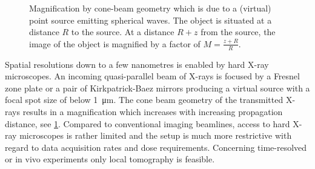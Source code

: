 \documentclass[
twoside,
openright,
titlepage,
numbers=noenddot,
headinclude,
fleqn,
a4paper,
footinclude=true,
cleardoublepage=empty,
abstractoff,
BCOR=5mm,
paper=a4,
fontsize=11pt,
british,ngerman,american,
]{scrreprt}
\begin{document}
\begin{figure}
  \centering
  \caption[Magnification by cone-beam geometry.]{Magnification by
    cone-beam geometry which is due to a (virtual) point source
    emitting spherical waves.  The object is situated at a distance
    $R$ to the source.  At a distance $R+z$ from the source, the image
    of the object is magnified by a factor of $M=\frac{z+R}{R}$.}
  \label{fig:cone-beam-magnification}
\end{figure}
Spatial resolutions down to a few nanometres is enabled by hard X-ray
microscopes.  An incoming quasi-parallel beam of X-rays is focused by
a Fresnel zone plate or a pair of Kirkpatrick-Baez mirrors
\cite{Hignette2005} producing a virtual source with a focal spot size
of below \SI{1}{\micro\metre}.  The cone beam geometry of the
transmitted X-rays results in a magnification which increases with
increasing propagation distance, see
\cref{fig:cone-beam-magnification}.  Compared to conventional imaging
beamlines, access to hard X-ray microscopes is rather limited and the
setup is much more restrictive with regard to data acquisition rates
and dose requirements.  Concerning time-resolved or in vivo
experiments only local tomography is feasible.
\end{document}
